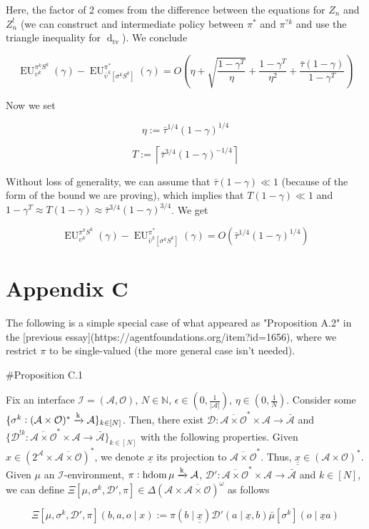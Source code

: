 \documentclass[a4paper]{article}
\newcommand{\AB}[1]{\left[#1\right]}
\newcommand{\Dtv}{\operatorname{d}_{\text{tv}}}
\newcommand{\Nats}{\mathbb{N}}
\newcommand{\Abs}[1]{\left\vert #1 \right\vert}
\newcommand{\Ceil}[1]{\left\lceil #1 \right\rceil}
\newcommand{\M}{\xrightarrow{\textnormal{k}}}
\newcommand{\Ob}{\mathcal{O}}
\newcommand{\A}{\mathcal{A}}
\newcommand{\In}{\mathcal{I}}
\newcommand{\FH}{(\A \times \Ob)^*}
\newcommand{\Ada}{\bar{\A}}
\newcommand{\Adao}{\overline{\A \times \Ob}}
\newcommand{\Adfh}{\Adao^*}
\DeclareMathOperator{\HD}{hdom}
\newcommand{\EU}{\operatorname{EU}}
\newcommand{\Dl}{\mathcal{D}}
\begin{document}
Here, the factor of 2 comes from the difference between the equations for $Z_n$ and $Z^!_n$ (we can construct and intermediate policy between $\pi^*$ and $\pi^{?k}$ and use the triangle inequality for $\Dtv$). We conclude

$$\EU^{\pi^k S^k}_{\upsilon^k}(\gamma)-\EU^{\pi^{*}}_{\bar{\upsilon}^k\AB{\sigma^k S^k}}(\gamma) = O\left(\eta+\sqrt{\frac{1-\gamma^T}{\eta}} +\frac{1-\gamma^T}{\eta^2}+\frac{\bar{\tau}(1-\gamma)}{1-\gamma^T}\right)$$

Now we set 

$$\eta:=\bar{\tau}^{1/4} (1-\gamma)^{1/4}$$  

$$T:=\Ceil{\bar{\tau}^{3/4}(1-\gamma)^{-1/4}}$$

Without loss of generality, we can assume that $\bar{\tau}(1-\gamma) \ll 1$ (because of the form of the bound we are proving), which implies that $T(1-\gamma) \ll 1$ and $1-\gamma^T \approx T(1-\gamma) \approx \bar{\tau}^{3/4}(1-\gamma)^{3/4}$. We get

$$\EU^{\pi^k S^k}_{\upsilon^k}(\gamma)-\EU^{\pi^{*}}_{\bar{\upsilon}^k\AB{\sigma^k S^k}}(\gamma) = O\left(\bar{\tau}^{1/4}(1-\gamma)^{1/4}\right)$$

\section{Appendix C}

The following is a simple special case of what appeared as "Proposition A.2" in the [previous essay](https://agentfoundations.org/item?id=1656), where we restrict $\pi$ to be single-valued (the more general case isn't needed).

\#Proposition C.1

Fix an interface $\In=(\A,\Ob)$, $N \in \Nats$, $\epsilon \in (0,\frac{1}{\Abs{\A}})$, $\eta \in (0,\frac{1}{N})$. Consider some $\{\sigma^k: \FH \M \A\}_{k \in [N]}$. Then, there exist $\Dl: \Adfh \times \A \rightarrow \Ada$ and $\{\Dl^{!k}: \Adfh \times \A \rightarrow \Ada\}_{k \in [N]}$ with the following properties. Given $x \in \left(2^\A \times \Adao\right)^*$, we denote $\underline{x}$ its projection to $\Adfh$. Thus, $\underline{\underline{x}}\in\FH$.
Given  $\mu$ an $\In$-environment, $\pi: \HD{\mu} \M \A$, $\Dl': \Adfh \times \A \rightarrow \Ada$ and $k \in [N]$, we can define $\Xi\left[\mu,\sigma^k,\Dl',\pi\right]\in \Delta\left(\A \times \Adao\right)^\omega$ as follows
 
$$\Xi\left[\mu,\sigma^k,\Dl',\pi\right]\left(b,a,o \mid x\right):=\pi\left(b \mid \underline{\underline{x}}\right)\Dl'\left(a \mid \underline{x},b\right) \bar{\mu}[\sigma^k]\left(o \mid \underline{x}a\right)$$
\end{document}
